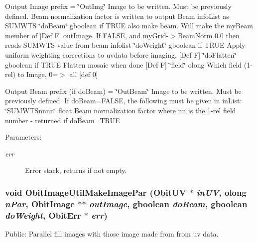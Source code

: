 \begin{Desc}
\begin{description}
Output Image prefix = \char`\"{}Out\-Img\char`\"{} Image to be written. Must be previously defined. Beam normalization factor is written to output Beam info\-List as SUMWTS \char`\"{}do\-Beam\char`\"{} gboolean if TRUE also make beam. Will make the my\-Beam member of [Def F] out\-Image. If FALSE, and my\-Grid-$>$Beam\-Norm 0.0 then reads SUMWTS value from beam infolist \char`\"{}do\-Weight\char`\"{} gboolean if TRUE Apply uniform weighting corrections to uvdata before imaging. [Def F] \char`\"{}do\-Flatten\char`\"{} gboolean if TRUE Flatten mosaic when done [Def F] \char`\"{}field\char`\"{} olong Which field (1-rel) to Image, 0=$>$ all [def 0]\end{description}
\end{Desc}
Output Beam prefix (if do\-Beam) = \char`\"{}Out\-Beam\char`\"{} Image to be written. Must be previously defined. If do\-Beam=FALSE, the following must be given in in\-List: \char`\"{}SUMWTSnnnn\char`\"{} float Beam normalization factor where nn is the 1-rel field number - returned if do\-Beam=TRUE \begin{Desc}
\item[Parameters:]
\begin{description}
\item[{\em err}]Error stack, returns if not empty. \end{description}
\end{Desc}
\subsubsection{\setlength{\rightskip}{0pt plus 5cm}void Obit\-Image\-Util\-Make\-Image\-Par ({\bf Obit\-UV} $\ast$ {\em in\-UV}, {\bf olong} {\em n\-Par}, {\bf Obit\-Image} $\ast$$\ast$ {\em out\-Image}, gboolean {\em do\-Beam}, gboolean {\em do\-Weight}, {\bf Obit\-Err} $\ast$ {\em err})}\label{ObitImageUtil_8h_a3}


Public: Parallel fill images with those image made from from uv data. 

